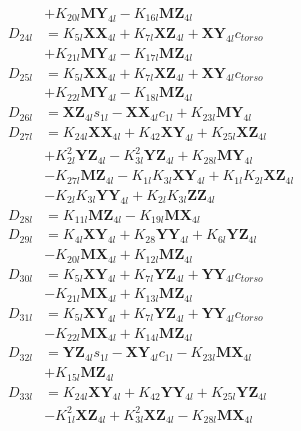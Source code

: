 \begin{multicols}{2}
\begin{align}
&+ K_{20l}\mathbf{MY}_{4l} - K_{16l}\mathbf{MZ}_{4l} \nonumber \\
D_{24l} &= K_{5l}\mathbf{XX}_{4l} + K_{7l}\mathbf{XZ}_{4l} + \mathbf{XY}_{4l}c_{torso}  \nonumber \\
&+ K_{21l}\mathbf{MY}_{4l} - K_{17l}\mathbf{MZ}_{4l} \nonumber \\
D_{25l} &= K_{5l}\mathbf{XX}_{4l} + K_{7l}\mathbf{XZ}_{4l} + \mathbf{XY}_{4l}c_{torso}  \nonumber \\
&+ K_{22l}\mathbf{MY}_{4l} - K_{18l}\mathbf{MZ}_{4l} \nonumber \\
D_{26l} &= \mathbf{XZ}_{4l}s_{1l} - \mathbf{XX}_{4l}c_{1l} + K_{23l}\mathbf{MY}_{4l} \nonumber \\
D_{27l} &= K_{24l}\mathbf{XX}_{4l} + K_{42}\mathbf{XY}_{4l} + K_{25l}\mathbf{XZ}_{4l}  \nonumber \\
&+ K_{2l}^2\mathbf{YZ}_{4l} - K_{3l}^2\mathbf{YZ}_{4l} + K_{28l}\mathbf{MY}_{4l}  \nonumber \\
&- K_{27l}\mathbf{MZ}_{4l} - K_{1l}K_{3l}\mathbf{XY}_{4l} + K_{1l}K_{2l}\mathbf{XZ}_{4l}  \nonumber \\
&- K_{2l}K_{3l}\mathbf{YY}_{4l} + K_{2l}K_{3l}\mathbf{ZZ}_{4l} \nonumber \\
D_{28l} &= K_{11l}\mathbf{MZ}_{4l} - K_{19l}\mathbf{MX}_{4l} \nonumber \\
D_{29l} &= K_{4l}\mathbf{XY}_{4l} + K_{28}\mathbf{YY}_{4l} + K_{6l}\mathbf{YZ}_{4l}  \nonumber \\
&- K_{20l}\mathbf{MX}_{4l} + K_{12l}\mathbf{MZ}_{4l} \nonumber \\
D_{30l} &= K_{5l}\mathbf{XY}_{4l} + K_{7l}\mathbf{YZ}_{4l} + \mathbf{YY}_{4l}c_{torso}  \nonumber \\
&- K_{21l}\mathbf{MX}_{4l} + K_{13l}\mathbf{MZ}_{4l} \nonumber \\
D_{31l} &= K_{5l}\mathbf{XY}_{4l} + K_{7l}\mathbf{YZ}_{4l} + \mathbf{YY}_{4l}c_{torso}  \nonumber \\
&- K_{22l}\mathbf{MX}_{4l} + K_{14l}\mathbf{MZ}_{4l} \nonumber \\
D_{32l} &= \mathbf{YZ}_{4l}s_{1l} - \mathbf{XY}_{4l}c_{1l} - K_{23l}\mathbf{MX}_{4l}  \nonumber \\
&+ K_{15l}\mathbf{MZ}_{4l} \nonumber \\
D_{33l} &= K_{24l}\mathbf{XY}_{4l} + K_{42}\mathbf{YY}_{4l} + K_{25l}\mathbf{YZ}_{4l}  \nonumber \\
&- K_{1l}^2\mathbf{XZ}_{4l} + K_{3l}^2\mathbf{XZ}_{4l} - K_{28l}\mathbf{MX}_{4l}  \nonumber \\

\end{align}
\end{multicols}
